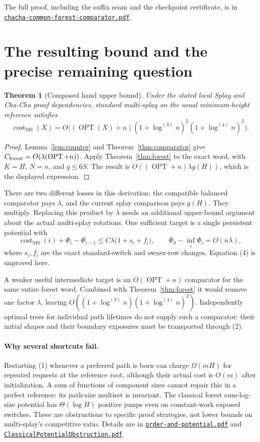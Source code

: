 \documentclass[11pt]{article}
\newtheorem{theorem}{Theorem}
\newcommand{\OPT}{\operatorname{OPT}}
\newcommand{\cost}{\operatorname{cost}}
\newcommand{\MS}{\operatorname{MS}}
\newcommand{\lgit}[1]{\log^{(#1)}}
\begin{document}
The full proof, including the suffix seam and the checkpoint certificate,
is in \href{chacha-common-forest-comparator.pdf}{\texttt{chacha-common-forest-comparator.pdf}}.

\section{The resulting bound and the precise remaining question}

\begin{theorem}[Composed hand upper bound]\label{thm:main}
Under the stated local Splay and Cha-Cha proof dependencies,
standard multi-splay on the usual minimum-height reference satisfies
\[
 \boxed{\displaystyle
 \cost_{\MS}(X)=
 O\bigl((\OPT(X)+n)(1+\lgit{3}n)^2(1+\lgit{4}n)^2\bigr).}
\]
\end{theorem}

\begin{proof}
Lemma~\ref{lem:counter} and Theorem~\ref{thm:comparator} give
$C_{\rm forest}=O(\lambda(\OPT+n))$.
Apply Theorem~\ref{thm:forest} to the exact word, with $K=H$,
$N=n$, and $q\le6S$. The result is
$O((\OPT+n)\lambda g(H))$, which is the displayed expression.
\end{proof}

There are two different losses in this derivation: the compatible
balanced comparator pays $\lambda$, and the current splay comparison
pays $g(H)$. They multiply. Replacing this product by $\lambda$ needs
an additional upper-bound argument about the actual multi-splay
rotations. One sufficient target is a single persistent potential with
\[
 \cost_{\MS}(i)+\Phi_i-\Phi_{i-1}
 \le C\lambda\bigl(1+s_i+f_i\bigr),\qquad
 \Phi_0-\inf_i\Phi_i=O(n\lambda),                       \tag{4}
\]
where $s_i,f_i$ are the exact standard-switch and owner-row changes.
Equation (4) is unproved here.

A weaker useful intermediate target is an $O(\OPT+n)$ comparator
for the same entire forest word. Combined with Theorem~\ref{thm:forest}
it would remove one factor $\lambda$, leaving
$O((1+\lgit{3}n)(1+\lgit{4}n)^2)$. Independently optimal trees for
individual path lifetimes do not supply such a comparator: their initial
shapes and their boundary exposures must be transported through (2).

\paragraph{Why several shortcuts fail.}
Restarting (1) whenever a preferred path is born can charge
$\Omega(mH)$ for repeated requests at the reference root, although
their actual cost is $O(m)$ after initialization. A sum of functions of
component sizes cannot repair this in a perfect reference: its path-size
multiset is invariant. The classical forest sum-log-size potential has
$\Theta(\log H)$ positive jumps even on constant-work exposed switches.
These are obstructions to specific proof strategies, not lower bounds
on multi-splay's competitive ratio. Details are in
\href{order-and-potential.pdf}{\texttt{order-and-potential.pdf}} and
\href{ClassicalPotentialObstruction.pdf}{\texttt{ClassicalPotentialObstruction.pdf}}.
\end{document}
